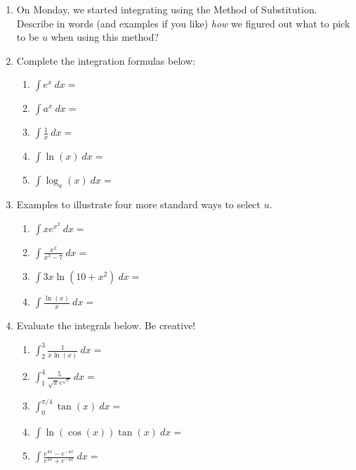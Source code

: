 \documentclass[11pt,fleqn]{article}
\def\ds{\displaystyle}
\begin{document}
\vspace*{-0.7in}

\begin{center}
  \Large{}
  \end{center}
\begin{enumerate}
\item On Monday, we started integrating using the Method of Substitution. Describe in words (and examples if you like) \emph{how} we figured out what to pick to be $u$ when using this method?
\vspace{1in}
\item Complete the integration formulas below:
	\begin{multicols}{2}
	\begin{enumerate}
	\item $\ds{\int e^x\: dx}=$
	\item $\ds{\int a^x\: dx}=$
	\item $\ds{\int \frac{1}{x}\: dx}=$
	\item $\ds{\int \ln(x) \: dx}=$\\
	
	\item $\ds{\int \log_a(x) \: dx}=$\\
	\end{enumerate}
	\end{multicols}
\item Examples to illustrate four more standard ways to select $u.$
	\begin{enumerate}
	\item $\ds{\int xe^{x^2}\: dx}=$
	\vfill
	\item $\ds{\int \frac{x^2}{x^3-7}\: dx}=$
	\vfill
	\item $\ds{\int 3x \ln(10+x^2)\: dx}=$
	\vfill
	\item $\ds{\int \frac{\ln(x)}{x}\: dx}=$
	\vfill
	\end{enumerate}
\newpage
\item Evaluate the integrals below. Be creative!
\begin{enumerate}
	\item $\ds{\int_2^3 \frac{1}{x \ln(x)} \: dx}=$
	\vfill
	\item $\ds{\int_1^4 \frac{5}{\sqrt{x}e^{\sqrt{x}}} \: dx}=$
	\vfill
	\item $\ds{\int_0^{\pi/4} \tan(x) \: dx}=$
	\vfill
	\item $\ds{\int \ln(\cos(x)) \tan(x) \: dx}=$
	\vfill
	\item $\ds{\int\frac{e^{4x} - e^{-4x}}{e^{4x} + e^{-4x}} \: dx}=$
	\vfill
\end{enumerate}
	
\end{enumerate}
\end{document}
